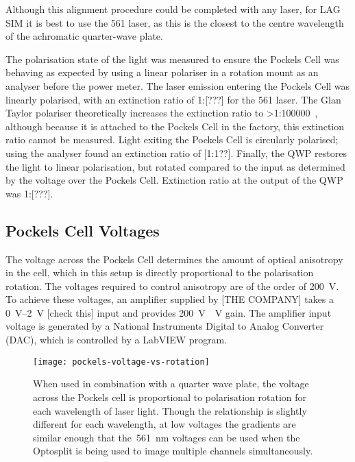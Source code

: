 Although this alignment procedure could be completed with any laser, for LAG SIM it is best to use the 561 laser, as this is the closest to the centre wavelength of the achromatic quarter-wave plate. 

The polarisation state of the light was measured to ensure the Pockels Cell was behaving as expected by using a linear polariser in a rotation mount as an analyser before the power meter. 
The laser emission entering the Pockels Cell was linearly polarised, with an extinction ratio of 1:[???] for the 561 laser. 
The Glan Taylor polariser theoretically increases the extinction ratio to >1:\num{100000}~\cite{bennett1995handbook}, although because it is attached to the Pockels Cell in the factory, this extinction ratio cannot be measured. 
Light exiting the Pockels Cell is circularly polarised; using the analyser found an extinction ratio of [1:1??]. 
Finally, the QWP restores the light to linear polarisation, but rotated compared to the input as determined by the voltage over the Pockels Cell. Extinction ratio at the output of the QWP was 1:[???]. 

\subsection{Pockels Cell Voltages}
The voltage across the Pockels Cell determines the amount of optical anisotropy in the cell, which in this setup is directly proportional to the polarisation rotation. 
The voltages required to control anisotropy are of the order of \SI{200}{\volt}. 
To achieve these voltages, an amplifier supplied by [THE COMPANY] takes a \SIrange{0}{2}{\volt} [check this] input and provides \SI{200}{\volt\/\volt} gain. 
The amplifier input voltage is generated by a National Instruments Digital to Analog Converter (DAC), which is controlled by a LabVIEW program. 

\begin{figure}[htbp!]
\centering
\texttt{[image: pockels-voltage-vs-rotation]}
\caption[LAG SIM: A Pockels cell is used to rotate the polarisation of laser light for maximum SIM pattern contrast]{When used in combination with a quarter wave plate, the voltage across the Pockels cell is proportional to polarisation rotation for each wavelength of laser light. Though the relationship is slightly different for each wavelength, at low voltages the gradients are similar enough that the~\SI{561}{\nano\metre} voltages can be used when the Optosplit is being used to image multiple channels simultaneously.}
\label{fig:pockels-voltage-rotation}
\end{figure}

